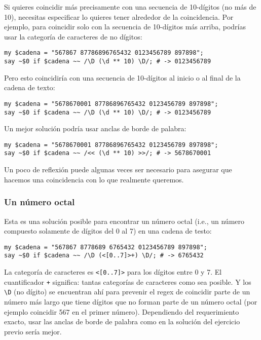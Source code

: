 Si quieres coincidir más precisamente con una secuencia de
10-dígitos (no más de 10), necesitas especificar lo quieres
tener alrededor de la coincidencia. Por ejemplo, para coincidir
solo con la secuencia de 10-dígitos más arriba, podrías
usar la categoría de caracteres de no dígitos:

\begin{verbatim}
my $cadena = "567867 87786896765432 0123456789 897898";
say ~$0 if $cadena ~~ /\D (\d ** 10) \D/; # -> 0123456789
\end{verbatim}

Pero esto coincidiría con una secuencia de 10-dígitos al 
inicio o al final de la cadena de texto:

\begin{verbatim}
my $cadena = "5678670001 87786896765432 0123456789 897898";
say ~$0 if $cadena ~~ /\D (\d ** 10) \D/; # -> 0123456789
\end{verbatim}

Un mejor solución podría usar anclas de borde de palabra:

\begin{verbatim}
my $cadena = "5678670001 87786896765432 0123456789 897898";
say ~$0 if $cadena ~~ /<< (\d ** 10) >>/; # -> 5678670001
\end{verbatim}

Un poco de reflexión puede algunas veces ser necesario para
asegurar que hacemos una coincidencia con lo que realmente queremos.

\subsubsection{Un número octal}

Esta es una solución posible para encontrar un número octal (i.e., 
un número compuesto solamente de  dígitos del 0 al 7) en una cadena
de testo:

\begin{verbatim}
my $cadena = "567867 8778689 6765432 0123456789 897898";
say ~$0 if $cadena ~~ /\D (<[0..7]>+) \D/; # -> 6765432
\end{verbatim}

La categoría de caracteres es \verb|<[0..7]>| para los dígitos 
entre 0 y 7. El cuantificador \verb|+| significa: tantas categorías
de caracteres como sea posible. Y los \verb|\D| (no dígito) se encuentran
ahí para prevenir el regex de coincidir parte de un número más
largo que tiene dígitos que no forman parte de un número octal (por 
ejemplo coincidir 567 en el primer número). Dependiendo del
requerimiento exacto, usar las anclas de borde de palabra como 
en la solución del ejercicio previo sería mejor.

